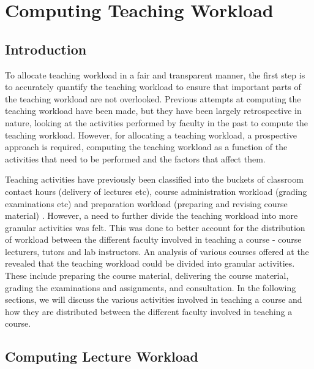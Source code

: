 \chapter{Computing Teaching Workload}

\section{Introduction}

To allocate teaching workload in a fair and transparent manner, the first step is to accurately quantify the teaching workload to ensure that important parts of the teaching workload are not overlooked. Previous attempts at computing the teaching workload have been made, but they have been largely retrospective in nature, looking at the activities performed by faculty in the past to compute the teaching workload. However, for allocating a teaching workload, a prospective approach is required, computing the teaching workload as a function of the activities that need to be performed and the factors that affect them.

Teaching activities have previously been classified into the buckets of classroom contact hours (delivery of lectures etc), course administration workload (grading examinations etc) and preparation workload (preparing and revising course material) \cite{griffith2020framework}. However, a need to further divide the teaching workload into more granular activities was felt. This was done to better account for the distribution of workload between the different faculty involved in teaching a course - course lecturers, tutors and lab instructors. An analysis of various courses offered at the \deptname revealed that the teaching workload could be divided into granular activities. These include preparing the course material, delivering the course material, grading the examinations and assignments, and consultation. In the following sections, we will discuss the various activities involved in teaching a course and how they are distributed between the different faculty involved in teaching a course.

\section{Computing Lecture Workload}
\label{sec:workload_of_course_lecturers}

